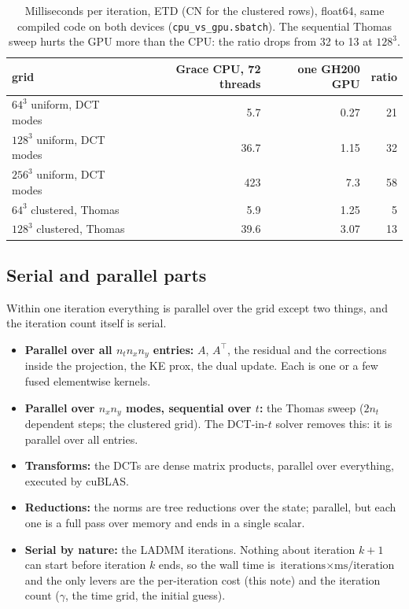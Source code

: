 \documentclass[11pt]{article}
\newcommand{\code}[1]{\texttt{#1}}
\begin{document}
\begin{table}[h]
\centering
\begin{tabular}{lrrr}
\toprule
grid & Grace CPU, 72 threads & one GH200 GPU & ratio \\
\midrule
$64^3$ uniform, DCT modes   & 5.7  & 0.27 & 21 \\
$128^3$ uniform, DCT modes  & 36.7 & 1.15 & 32 \\
$256^3$ uniform, DCT modes  & 423  & 7.3  & 58 \\
$64^3$ clustered, Thomas    & 5.9  & 1.25 & 5 \\
$128^3$ clustered, Thomas   & 39.6 & 3.07 & 13 \\
\bottomrule
\end{tabular}
\caption{Milliseconds per iteration, ETD (CN for the clustered rows), float64, same
compiled code on both devices (\code{cpu\_vs\_gpu.sbatch}). The sequential Thomas sweep
hurts the GPU more than the CPU: the ratio drops from 32 to 13 at $128^3$.}
\label{tab:cpugpu}
\end{table}

\subsection{Serial and parallel parts}

Within one iteration everything is parallel over the grid except two things, and the
iteration count itself is serial.
\begin{itemize}
  \item \textbf{Parallel over all $n_t n_x n_y$ entries:} $A$, $A^{\!\top}$, the
  residual and the corrections inside the projection, the KE prox, the dual update.
  Each is one or a few fused elementwise kernels.
  \item \textbf{Parallel over $n_x n_y$ modes, sequential over $t$:} the Thomas sweep
  ($2n_t$ dependent steps; the clustered grid). The DCT-in-$t$ solver removes this:
  it is parallel over all entries.
  \item \textbf{Transforms:} the DCTs are dense matrix products, parallel over
  everything, executed by cuBLAS.
  \item \textbf{Reductions:} the norms are tree reductions over the state; parallel,
  but each one is a full pass over memory and ends in a single scalar.
  \item \textbf{Serial by nature:} the LADMM iterations. Nothing about iteration $k+1$
  can start before iteration $k$ ends, so the wall time is
  $\text{iterations}\times\text{ms/iteration}$ and the only levers are the per-iteration
  cost (this note) and the iteration count ($\gamma$, the time grid, the initial
  guess).
\end{itemize}
\end{document}

